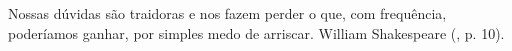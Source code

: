 %
%
%
%

\begin{epigrafe}
\vspace*{\fill}
\begingroup
\OnehalfSpacing
\leftskip=4cm
\noindent%
  Nossas dúvidas são traidoras e nos fazem perder o que, com frequência, poderíamos ganhar, por simples medo de arriscar.
  \flushright
  William Shakespeare (\citeyear{Silveira:2012}, p. 10).
\par
\endgroup
\end{epigrafe}
